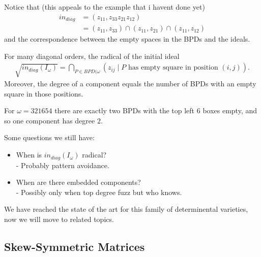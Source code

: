 \begin{example}
\begin{center}
\end{center}
Notice that (this appeals to the example that i havent done yet)
\begin{align*}
    in_{diag} &= (z_{11},  z_{33} z_{21} z_{12})\\
    &= (z_{11} ,  z_{33}) \cap ( z_{11} ,  z_{21}) \cap ( z_{11} ,  z_{12})
\end{align*}
and the correspondence between the empty spaces in the BPDs and the ideals.
\end{example}


\begin{theorem}
    For many diagonal orders, the radical of the initial ideal 
    \begin{align*}
        \sqrt{ in_{diag} (I_\omega) } = \bigcap_{P \in BPD(\omega} (z_{ij} \mid P \text{ has empty square in position } (i,j) ).
    \end{align*}
    Moreover, the degree of a component equals the number of BPDs with an empty square in those positions.
\end{theorem}

\begin{example}
    For $\omega = 321654$ there are exactly two BPDs with the top left $6$ boxes empty, and so one component has degree $2$.
\end{example}

\begin{remark}
    Some questions we still have:
    \begin{itemize}
        \item When is $in_{diag} (I_\omega ) $ radical?\\
        - Probably pattern avoidance.
        \item When are there embedded components?\\
        - Possibly only when top degree fuzz but who knows.
    \end{itemize}
\end{remark}

We have reached the state of the art for this family of determinental varieties, now we will move to related topics.

\subsection{Skew-Symmetric Matrices}

